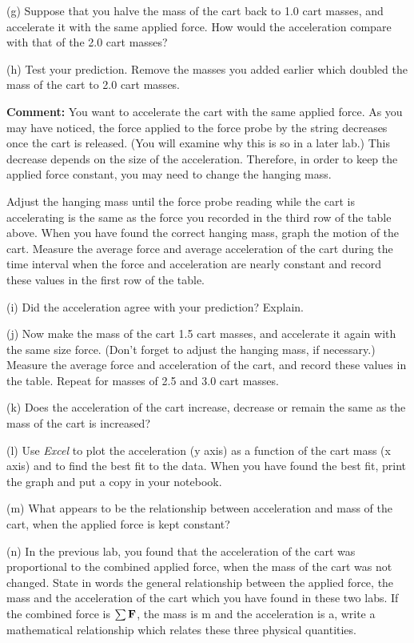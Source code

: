 \pagebreak[2]
(g) Suppose that you halve the mass of the cart back to 1.0 cart masses, and
accelerate it with the same applied force. How would the acceleration compare
with that of the 2.0 cart masses?
\answerspace{20mm}

(h) Test your prediction. Remove the masses you added earlier which doubled
the mass of the cart to 2.0 cart masses. 

\textbf{Comment:} You want to accelerate the cart with the same applied force.
As you may have noticed, the force applied to the force probe by the string
decreases once the cart is released. (You will examine why this is so in a later
lab.) This decrease depends on the size of the acceleration. Therefore, in order
to keep the applied force constant, you may need to change the hanging mass. 

Adjust the hanging mass until the force probe reading while the cart is accelerating
is the same as the force you recorded in the third row of the table above. When
you have found the correct hanging mass, graph the motion of the cart. Measure
the average force and average acceleration of the cart during the time interval
when the force and acceleration are nearly constant and record these values
in the first row of the table.

(i) Did the acceleration agree with your prediction? Explain.
\answerspace{20mm}

(j) Now make the mass of the cart 1.5 cart masses, and accelerate it again with
the same size force. (Don't forget to adjust the hanging mass, if necessary.)
Measure the average force and acceleration of the cart, and record these values
in the table. Repeat for masses of 2.5 and 3.0 cart masses.

(k) Does the acceleration of the cart increase, decrease or remain the same
as the mass of the cart is increased?
\answerspace{10mm}

(l) Use \textit{Excel} to plot the acceleration (y axis) as a function of the
cart mass (x axis) and to find the best fit to the data. When you have found
the best fit, print the graph and put a copy in your notebook. 

(m) What appears to be the relationship between acceleration and mass of the
cart, when the applied force is kept constant?
\answerspace{20mm}

(n) In the previous lab, you found that the acceleration of the cart was proportional
to the combined applied force, when the mass of the cart was not changed. State
in words the general relationship between the applied force, the mass and the
acceleration of the cart which you have found in these two labs. If the combined
force is \( \sum{\bf F}  \), the mass is m and the acceleration is a,
write a mathematical relationship which relates these three physical quantities.
\answerspace{20mm}

